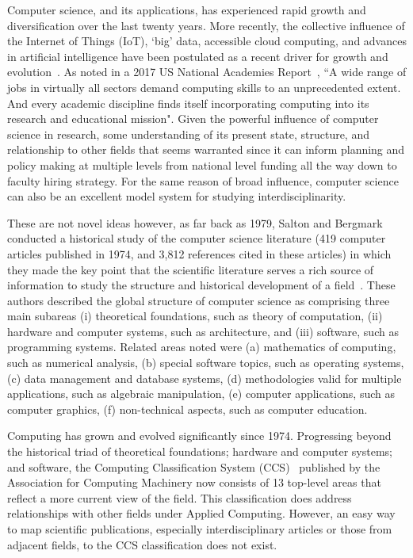 Computer science, and its applications, has experienced rapid growth and diversification over the last twenty years. More recently, the collective influence of the Internet of Things (IoT), `big' data, accessible cloud computing, and advances in artificial intelligence have been postulated as a recent driver for growth and evolution~\cite{siebel2019_digital}. As noted in a 2017 US National Academies Report~\cite{nas_2017}, ``A wide range of jobs in virtually all sectors demand computing skills to an unprecedented extent. And every academic discipline finds itself incorporating computing into its research and educational mission". Given the powerful influence of computer science in research, some understanding of its present state, structure, and relationship to other fields that seems warranted since it can inform planning and policy making at multiple levels from national level funding all the way down to faculty hiring strategy. For the same reason of broad influence, computer science can also be an excellent model system for studying interdisciplinarity. 

These are not novel ideas however, as far back as 1979, Salton and Bergmark conducted a historical study of the computer science literature (419 computer articles published in 1974,  and 3,812 references cited in these articles) in which they made the key point that the scientific literature serves a rich source of information to study the structure and historical development of a field~\cite{salton_citation_1979}. These authors described the global structure of computer science as comprising three main subareas (i) theoretical foundations, such as theory of computation, (ii) hardware and computer systems, such as architecture,  and (iii) software, such as programming systems.  Related areas noted were  (a) mathematics of computing, such as numerical analysis, (b) special software topics, such as operating systems, (c) data management and database systems, (d) methodologies valid for multiple applications, such as algebraic manipulation, (e) computer applications, such as computer graphics, (f) non-technical aspects, such as computer education. 

Computing has grown and evolved significantly since 1974. Progressing beyond the historical triad of theoretical foundations; hardware and computer systems; and software\cite{salton_citation_1979}, the Computing Classification System (CCS)~\cite{acm_ref} published by the Association for Computing Machinery now consists of 13 top-level areas that reflect a more current view of the field. This classification does address relationships with other fields under Applied Computing. However, an easy way to map scientific publications, especially interdisciplinary articles or those from adjacent fields, to the CCS classification does not exist. 

